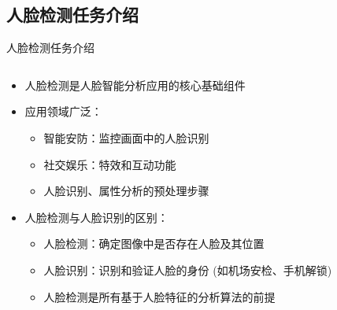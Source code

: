 \documentclass{beamer}
\begin{document}
\subsection{人脸检测任务介绍}
\begin{frame}{人脸检测任务介绍}
    \begin{columns}[T]
        \begin{column}{0.65\textwidth}
            \begin{itemize}
                \item 人脸检测是人脸智能分析应用的核心基础组件
                \item 应用领域广泛：
                    \begin{itemize}
                        \item 智能安防：监控画面中的人脸识别
                        \item 社交娱乐：特效和互动功能
                        \item 人脸识别、属性分析的预处理步骤
                    \end{itemize}
                \item 人脸检测与人脸识别的区别：
                    \begin{itemize}
                        \item 人脸检测：确定图像中是否存在人脸及其位置
                        \item 人脸识别：识别和验证人脸的身份 (如机场安检、手机解锁)
                        \item 人脸检测是所有基于人脸特征的分析算法的前提
                    \end{itemize}
            \end{itemize}
        \end{column}
        \begin{column}{0.3\textwidth}
            \centering
            \vfill

\end{column}
\end{columns}
\end{frame}
\end{document}
